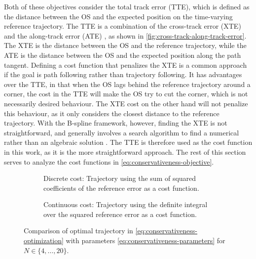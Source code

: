 Both of these objectives consider the total track error (TTE), which is defined as the distance between the OS and the expected position on the time-varying reference trajectory. The TTE is a combination of the cross-track error (XTE) and the along-track error (ATE) \citep{Fossen2011-Handbook}, as shown in \cref{fig:cross-track-along-track-error}. The XTE is the distance between the OS and the reference trajectory, while the ATE is the distance between the OS and the expected position along the path tangent. Defining a cost function that penalizes the XTE is a common approach if the goal is path following rather than trajectory following. It has advantages over the TTE, in that when the OS lags behind the reference trajectory around a corner, the cost in the TTE will make the OS try to cut the corner, which is not necessarily desired behaviour. The XTE cost on the other hand will not penalize this behaviour, as it only considers the closest distance to the reference trajectory. 
With the B-spline framework, however, finding the XTE is not straightforward, and generally involves a search algorithm to find a numerical rather than an algebraic solution \citep{johnson2005distance,hu2005second,chen2009computing}. The TTE is therefore used as the cost function in this work, as it is the more straightforward approach. The rest of this section serves to analyze the cost functions in \cref{eq:conservativeness-objective}.

\begin{figure}
    \centering
    \begin{subfigure}[b]{\textwidth}
        \centering
        
        \caption{Discrete cost: Trajectory using the sum of squared coefficients of the reference error as a cost function.}
        \label{fig:conservativeness-traj-coeffs}
    \end{subfigure}
    \hfill
    \begin{subfigure}[b]{\textwidth}
        \centering
        
        \caption{Continuous cost: Trajectory using the definite integral over the squared reference error as a cost function.}
        \label{fig:conservativeness-traj-integral}
    \end{subfigure}
    \caption{Comparison of optimal trajectory in \cref{eq:conservativeness-optimization} with parameters \cref{eq:conservativeness-parameters} for $N\in\{4,\ldots,20\}$.}
    \label{fig:conservativeness-traj}
\end{figure}


